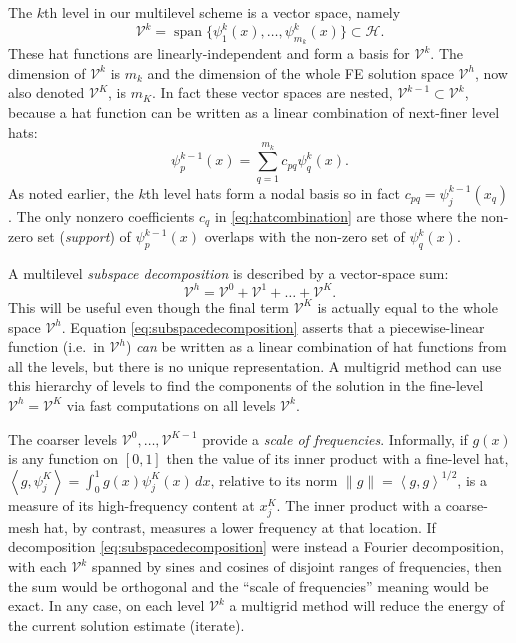 \documentclass[letterpaper,final,12pt,reqno]{amsart}
\newcommand{\ip}[2]{\left<#1,#2\right>}
\numberwithin{equation}{section}
\numberwithin{figure}{section}
\numberwithin{table}{section}
\begin{document}
The $k$th level in our multilevel scheme is a vector space, namely
\begin{equation}
  \mathcal{V}^k = \operatorname{span}\{\psi_1^k(x),\dots,\psi_{m_k}^k(x)\} \subset \mathcal{H}.  \label{eq:definevk}
\end{equation}
These hat functions are linearly-independent and form a basis for $\mathcal{V}^k$.  The dimension of $\mathcal{V}^k$ is $m_k$ and the dimension of the whole FE solution space $\mathcal{V}^h$, now also denoted $\mathcal{V}^K$, is $m_K$.  In fact these vector spaces are nested, $\mathcal{V}^{k-1} \subset \mathcal{V}^k$, because a hat function can be written as a linear combination of next-finer level hats:
\begin{equation}
   \psi_p^{k-1}(x) = \sum_{q=1}^{m_k} c_{pq} \psi_q^k(x). \label{eq:hatcombination}
\end{equation}
As noted earlier, the $k$th level hats form a nodal basis so in fact $c_{pq} = \psi_j^{k-1}(x_q)$.  The only nonzero coefficients $c_q$ in \eqref{eq:hatcombination} are those where the non-zero set (\emph{support}) of $\psi_p^{k-1}(x)$ overlaps with the non-zero set of $\psi_q^k(x)$.

A multilevel \emph{subspace decomposition} is described by a vector-space sum:
\begin{equation}
  \mathcal{V}^h = \mathcal{V}^0 + \mathcal{V}^1 + \dots + \mathcal{V}^K. \label{eq:subspacedecomposition}
\end{equation}
This will be useful even though the final term $\mathcal{V}^K$ is actually equal to the whole space $\mathcal{V}^h$.  Equation \eqref{eq:subspacedecomposition} asserts that a piecewise-linear function (i.e.~in $\mathcal{V}^h$) \emph{can} be written as a linear combination of hat functions from all the levels, but there is no unique representation.  A multigrid method can use this hierarchy of levels to find the components of the solution in the fine-level $\mathcal{V}^h=\mathcal{V}^K$ via fast computations on all levels $\mathcal{V}^k$.

The coarser levels $\mathcal{V}^0,\dots,\mathcal{V}^{K-1}$ provide a \emph{scale of frequencies}.  Informally, if $g(x)$ is any function on $[0,1]$ then the value of its inner product with a fine-level hat, $\ip{g}{\psi_j^K} = \int_0^1 g(x) \psi_j^K(x)\,dx$, relative to its norm $\|g\| = \ip{g}{g}^{1/2}$, is a measure of its high-frequency content at $x_j^K$.  The inner product with a coarse-mesh hat, by contrast, measures a lower frequency at that location.  If decomposition \eqref{eq:subspacedecomposition} were instead a Fourier decomposition, with each $\mathcal{V}^k$ spanned by sines and cosines of disjoint ranges of frequencies, then the sum would be orthogonal and the ``scale of frequencies'' meaning would be exact.  In any case, on each level $\mathcal{V}^k$ a multigrid method will reduce the energy of the current solution estimate (iterate).
\end{document}
